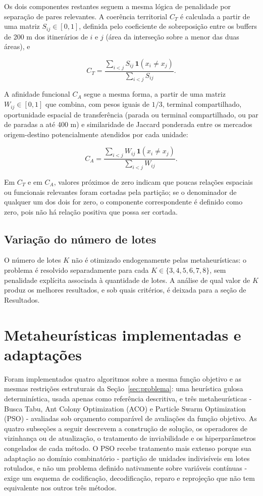 \documentclass[12pt,a4paper]{article}
\begin{document}
Os dois componentes restantes seguem a mesma lógica de penalidade por
separação de pares relevantes. A coerência territorial \(C_T\) é
calculada a partir de uma matriz \(S_{ij}\in[0,1]\), definida pelo
coeficiente de sobreposição entre os buffers de 200 m dos itinerários de
\(i\) e \(j\) (área da interseção sobre a menor das duas áreas), e

\[
C_T=\frac{\sum_{i<j}S_{ij}\,\mathbf{1}(x_i\neq x_j)}{\sum_{i<j}S_{ij}}.
\]

A afinidade funcional \(C_A\) segue a mesma forma, a partir de uma
matriz \(W_{ij}\in[0,1]\) que combina, com pesos iguais de \(1/3\),
terminal compartilhado, oportunidade espacial de transferência (parada
ou terminal compartilhado, ou par de paradas a até 400 m) e similaridade
de Jaccard ponderada entre os mercados origem-destino potencialmente
atendidos por cada unidade:

\[
C_A=\frac{\sum_{i<j}W_{ij}\,\mathbf{1}(x_i\neq x_j)}{\sum_{i<j}W_{ij}}.
\]

Em \(C_T\) e em \(C_A\), valores próximos de zero indicam que poucas
relações espaciais ou funcionais relevantes foram cortadas pela
partição; se o denominador de qualquer um dos dois for zero, o
componente correspondente é definido como zero, pois não há relação
positiva que possa ser cortada.

\subsection{Variação do número de lotes}

O número de lotes \(K\) não é otimizado endogenamente pelas
metaheurísticas: o problema é resolvido separadamente para cada
\(K\in\{3,4,5,6,7,8\}\), sem penalidade explícita associada à
quantidade de lotes. A análise de qual valor de \(K\) produz os
melhores resultados, e sob quais critérios, é deixada para a seção de
Resultados.

\section{Metaheurísticas implementadas e adaptações}
\label{sec:algoritmos}

Foram implementados quatro algoritmos sobre a mesma função objetivo e as
mesmas restrições estruturais da Seção~\ref{sec:problema}: uma heurística gulosa
determinística, usada apenas como referência descritiva, e três
metaheurísticas - Busca Tabu, Ant Colony Optimization (ACO) e Particle
Swarm Optimization (PSO) - avaliadas sob orçamento comparável de avaliações
da função objetivo. As quatro subseções a seguir descrevem a construção de
solução, os operadores de vizinhança ou de atualização, o tratamento de
inviabilidade e os hiperparâmetros congelados de cada método. O PSO recebe
tratamento mais extenso porque sua adaptação ao domínio combinatório -
partição de unidades indivisíveis em lotes rotulados, e não um problema
definido nativamente sobre variáveis contínuas - exige um esquema de
codificação, decodificação, reparo e reprojeção que não tem equivalente nos
outros três métodos.
\end{document}
